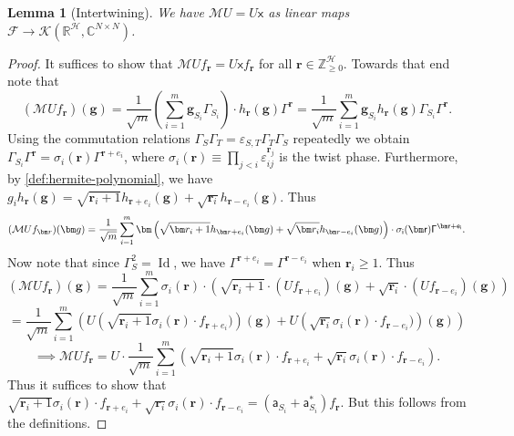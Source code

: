 \documentclass
[11pt,letterpaper]
{article}
\newtheorem{lemma}[theorem]{Lemma}
\theoremstyle{definition}
\newcommand{\sfa}{\mathsf a}
\newcommand{\sfx}{\mathsf x}
\newcommand{\R}{{\mathbb R}}
\newcommand{\eps}{\varepsilon}
\newcommand{\cF}{{\mathcal F}}
\newcommand{\1}{\mathbf{1}}
\newcommand{\Z}{\mathbb Z}
\newcommand{\C}{\mathbb C}
\newcommand{\cH}{\mathcal H}
\newcommand{\Id}{\operatorname{Id}}
\newcommand{\cK}{\mathcal K}
\newcommand{\cM}{\mathcal M}
\renewcommand{\geq}{\geqslant}
\begin{document}
\begin{lemma}[Intertwining]\label{lem:intertwining}
    We have $\cM U = U\sfx$ as linear maps $\cF\to\cK(\R^\cH, \C^{N\times N})$.
\end{lemma}
\begin{proof}
    It suffices to show that $\cM Uf_{\bm r} = U\sfx f_{\bm r}$ for all $\bm r\in\Z_{\geq 0}^\cH$. Towards that end note that 
    \[(\cM Uf_{\bm r})(\bm g) = \frac{1}{\sqrt{m}}\left(\sum_{i = 1}^m\bm g_{S_i}\Gamma_{S_i}\right)\cdot h_{\bm r}(\bm g)\Gamma^{\bm r} = \frac{1}{\sqrt{m}}\sum_{i = 1}^m\bm g_{S_i}h_{\bm r}(\bm g)\Gamma_{S_i}\Gamma^{\bm r}.\]
    Using the commutation relations $\Gamma_S\Gamma_T = \eps_{S, T}\Gamma_T\Gamma_S$ repeatedly we obtain $\Gamma_{S_i}\Gamma^{\bm r} = \sigma_i(\bm r)\Gamma^{\bm r + e_i}$, where $\sigma_i(\bm r) \equiv \prod_{j<i} \eps_{ij}^{\bm r_j}$ is the twist phase. Furthermore, by \cref{def:hermite-polynomial}, we have $g_ih_{\bm r}(\bm g) = \sqrt{\bm r_i + 1}h_{\bm r + e_i}(\bm g) + \sqrt{\bm r_i}h_{\bm r - e_i}(\bm g)$. Thus 
    \[(\cM Uf_{\bm r})(\bm g) = \frac{1}{\sqrt{m}}\sum_{i = 1}^m\bm \left(\sqrt{\bm r_i + 1}h_{\bm r + e_i}(\bm g) + \sqrt{\bm r_i}h_{\bm r - e_i}(\bm g)\right)\cdot\sf\sigma_i(\bm r)\Gamma^{\bm r + e_i}.\]
    Now note that since $\Gamma_S^2 = \Id$, we have $\Gamma^{\bm r + e_i} = \Gamma^{\bm r - e_i}$ when $\bm r_i\geq 1$. Thus 
    \[(\cM Uf_{\bm r})(\bm g) = \frac{1}{\sqrt{m}}\sum_{i = 1}^m \sigma_i(\bm r) \cdot \left(\sqrt{\bm r_i + 1}\cdot(Uf_{\bm r + e_i})(\bm g) + \sqrt{\bm r_i}\cdot(Uf_{\bm r - e_i})(\bm g)\right)\]
    \[ = \frac{1}{\sqrt{m}}\sum_{i = 1}^m\left(U\left(\sqrt{\bm r_i + 1}\sigma_i(\bm r)\cdot f_{\bm r + e_i})\right)(\bm g) + U\left(\sqrt{\bm r_i}\sigma_i(\bm r)\cdot f_{\bm r - e_i})\right)(\bm g)\right)\]
    \[\implies \cM Uf_{\bm r} = U\cdot \frac{1}{\sqrt{m}}\sum_{i = 1}^m\left(\sqrt{\bm r_i + 1}\sigma_i(\bm r)\cdot f_{\bm r + e_i} + \sqrt{\bm r_i}\sigma_i(\bm r)\cdot f_{\bm r - e_i}\right).\]
    Thus it suffices to show that $\sqrt{\bm r_i + 1}\sigma_i(\bm r)\cdot f_{\bm r + e_i} + \sqrt{\bm r_i}\sigma_i(\bm r)\cdot f_{\bm r - e_i} = (\sfa_{S_i} + \sfa^*_{S_i}) f_{\bm r}$. But this follows from the definitions.
\end{proof}
\end{document}
